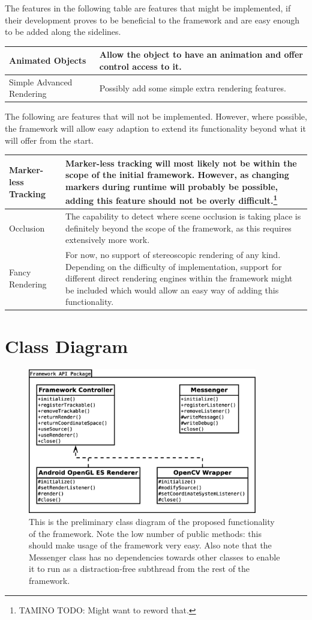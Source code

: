 The features in the following table are features that might be implemented, if their development proves to be beneficial to the framework and are easy enough to be added along the sidelines.

\begin{tabulary}{\textwidth}{L || L}
Animated Objects & Allow the object to have an animation and offer control access to it.\\
\hline
Simple Advanced Rendering & Possibly add some simple extra rendering features.\\
\end{tabulary}

The following are features that will not be implemented.
However, where possible, the framework will allow easy adaption to extend its functionality beyond what it will offer from the start.

\begin{tabulary}{\textwidth}{L || L}
Marker-less Tracking & Marker-less tracking will most likely not be within the scope of the initial framework. However, as changing markers during runtime will probably be possible, adding this feature should not be overly difficult.\footnote{TAMINO TODO: Might want to reword that.}\\
\hline
Occlusion & The capability to detect where scene occlusion is taking place is definitely beyond the scope of the framework, as this requires extensively more work.\\
\hline
Fancy Rendering & For now, no support of stereoscopic rendering of any kind. Depending on the difficulty of implementation, support for different direct rendering engines within the framework might be included which would allow an easy way of adding this functionality.\\
\end{tabulary}

\section{Class Diagram}

\begin{figure}
	\centering
	\includegraphics[width=10cm]{img/class_diagram.eps}
	\caption[General Class Diagram]{This is the preliminary class diagram of the proposed functionality of the framework. Note the low number of public methods: this should make usage of the framework very easy. Also note that the Messenger class has no dependencies towards other classes to enable it to run as a distraction-free subthread from the rest of the framework.}
	\label{fig:class_diagram}
\end{figure}

